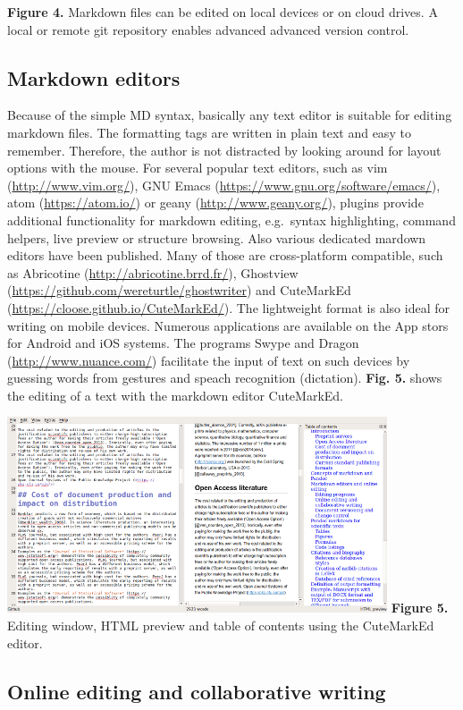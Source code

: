 \documentclass[10pt,fleqn]{wlpeerj}
\begin{document}
\textbf{Figure
4.}
Markdown
files
can
be
edited
on
local
devices
or on
cloud
drives.
A
local
or
remote
git
repository
enables
advanced
advanced
version
control.

\subsection{Markdown
editors}\label{markdown-editors}

Because
of
the
simple
MD
syntax,
basically
any
text
editor
is
suitable
for
editing
markdown
files.
The
formatting
tags
are
written
in
plain
text
and
easy
to
remember.
Therefore,
the
author
is
not
distracted
by
looking
around
for
layout
options
with
the
mouse.
For
several
popular
text
editors,
such
as
vim
(\url{http://www.vim.org/}),
GNU
Emacs
(\url{https://www.gnu.org/software/emacs/}),
atom
(\url{https://atom.io/})
or
geany
(\url{http://www.geany.org/}),
plugins
provide
additional
functionality
for
markdown
editing,
e.g.~syntax
highlighting,
command
helpers,
live
preview
or
structure
browsing.
Also
various
dedicated
mardown
editors
have
been
published.
Many
of
those
are
cross-platform
compatible,
such
as
Abricotine
(\url{http://abricotine.brrd.fr/}),
Ghostview
(\url{https://github.com/wereturtle/ghostwriter})
and
CuteMarkEd
(\url{https://cloose.github.io/CuteMarkEd/}).
The
lightweight
format
is
also
ideal
for
writing
on
mobile
devices.
Numerous
applications
are
available
on
the
App
stors
for
Android
and
iOS
systems.
The
programs
Swype
and
Dragon
(\url{http://www.nuance.com/})
facilitate
the
input
of
text
on
such
devices
by
guessing
words
from
gestures
and
speach
recognition
(dictation).
\textbf{Fig.
5.}
shows
the
editing
of a
text
with
the
markdown
editor
CuteMarkEd.

\includegraphics{fig-cutemarked-editor.png}
\textbf{Figure
5.}
Editing
window,
HTML
preview
and
table
of
contents
using
the
CuteMarkEd
editor.

\subsection{Online
editing
and
collaborative
writing}\label{online-editing-and-collaborative-writing}
\end{document}
